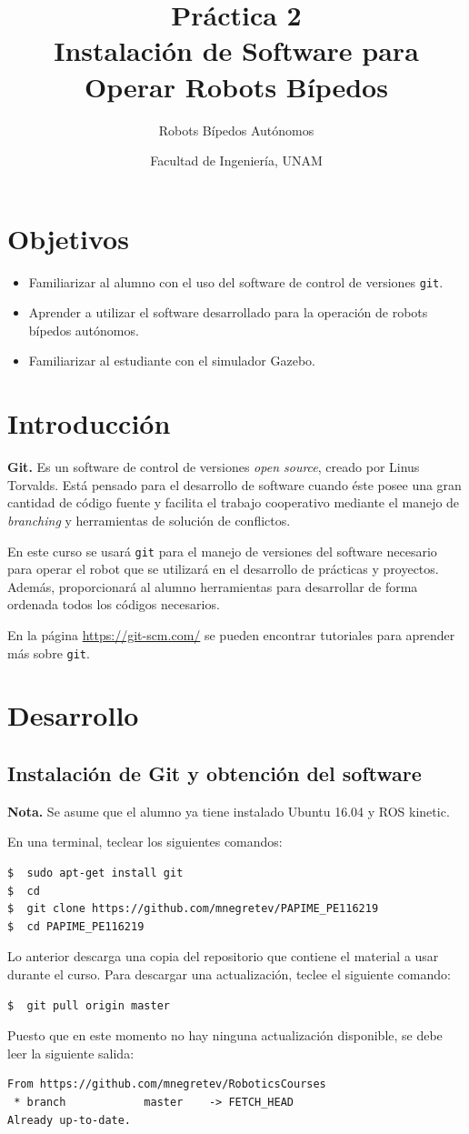 \documentclass[letterpaper,12pt]{article}
\title{Práctica 2 \\ Instalación de Software para Operar Robots Bípedos}
\author{Robots Bípedos Autónomos}
\date{Facultad de Ingeniería, UNAM}
\begin{document}
\renewcommand{\tablename}{Tabla}
\maketitle
\section*{Objetivos}
\begin{itemize}
\item Familiarizar al alumno con el uso del software de control de versiones \texttt{git}.
\item Aprender a utilizar el software desarrollado para la operación de robots bípedos autónomos.
\item Familiarizar al estudiante con el simulador Gazebo.
\end{itemize}

\section{Introducción}
\textbf{Git.} Es un software de control de versiones \textit{open source}, creado por Linus Torvalds. Está pensado para el desarrollo de software cuando éste posee una gran cantidad de código fuente y facilita el trabajo cooperativo mediante el manejo de \textit{branching} y herramientas de solución de conflictos. 

En este curso se usará \texttt{git} para el manejo de versiones del software necesario para operar el robot que se utilizará en el desarrollo de prácticas y proyectos. Además, proporcionará al alumno herramientas para desarrollar de forma ordenada todos los códigos necesarios.

En la página \url{https://git-scm.com/} se pueden encontrar tutoriales para aprender más sobre \texttt{git}.

\section{Desarrollo}
\subsection{Instalación de Git y obtención del software}
\textbf{Nota.} Se asume que el alumno ya tiene instalado Ubuntu 16.04 y ROS kinetic. 

En una terminal, teclear los siguientes comandos:
\begin{verbatim}
$  sudo apt-get install git
$  cd
$  git clone https://github.com/mnegretev/PAPIME_PE116219
$  cd PAPIME_PE116219
\end{verbatim}
Lo anterior descarga una copia del repositorio que contiene el material a usar durante el curso. Para descargar una actualización, teclee el siguiente comando:
\begin{verbatim}
$  git pull origin master
\end{verbatim}
Puesto que en este momento no hay ninguna actualización disponible, se debe leer la siguiente salida:
\begin{verbatim}
From https://github.com/mnegretev/RoboticsCourses
 * branch            master    -> FETCH_HEAD
Already up-to-date.
\end{verbatim}
\end{document}

